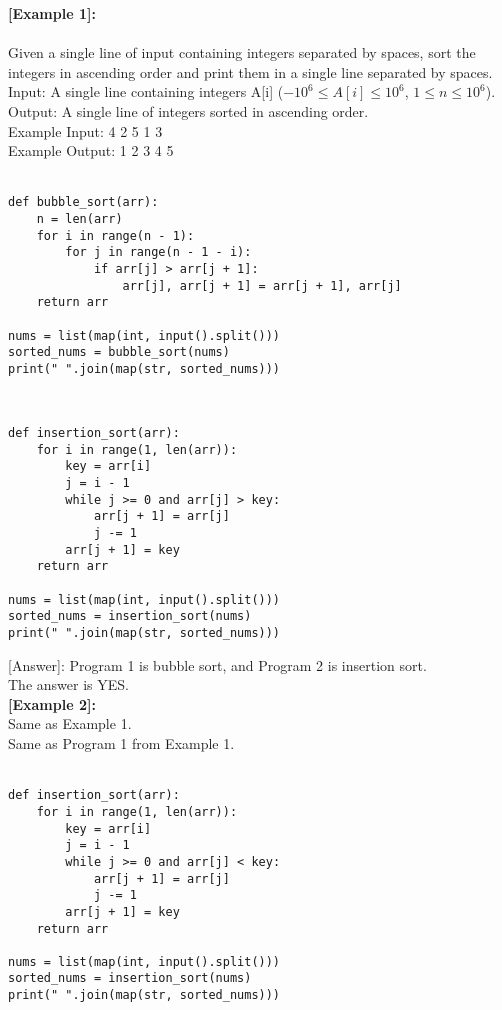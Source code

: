 \noindent\textbf{[Example 1]:}\\
\\
Given a single line of input containing integers separated by spaces, sort the integers in ascending order and print them in a single line separated by spaces.\\
Input: A single line containing integers A[i] ($-10^6 \leq A[i] \leq 10^6$, $1 \leq n \leq 10^6$).\\
Output: A single line of integers sorted in ascending order.\\
Example Input: 4 2 5 1 3\\
Example Output: 1 2 3 4 5\\

\text{[Program 1]:}\\
\begin{lstlisting}
def bubble_sort(arr):
    n = len(arr)
    for i in range(n - 1):
        for j in range(n - 1 - i):
            if arr[j] > arr[j + 1]:
                arr[j], arr[j + 1] = arr[j + 1], arr[j]
    return arr

nums = list(map(int, input().split()))
sorted_nums = bubble_sort(nums)
print(" ".join(map(str, sorted_nums)))
\end{lstlisting}

\text{[Program 2]:}\\
\begin{lstlisting}
def insertion_sort(arr):
    for i in range(1, len(arr)):
        key = arr[i]
        j = i - 1
        while j >= 0 and arr[j] > key:
            arr[j + 1] = arr[j]
            j -= 1
        arr[j + 1] = key
    return arr

nums = list(map(int, input().split()))
sorted_nums = insertion_sort(nums)
print(" ".join(map(str, sorted_nums)))
\end{lstlisting}

[Answer]: Program 1 is bubble sort, and Program 2 is insertion sort.\\
The answer is YES.\\

\noindent\textbf{[Example 2]:}\\
 Same as Example 1.\\
\text{[Program 1]:} Same as Program 1 from Example 1.\\
\text{[Program 2]:}\\
\begin{lstlisting}
def insertion_sort(arr):
    for i in range(1, len(arr)):
        key = arr[i]
        j = i - 1
        while j >= 0 and arr[j] < key:
            arr[j + 1] = arr[j]
            j -= 1
        arr[j + 1] = key
    return arr

nums = list(map(int, input().split()))
sorted_nums = insertion_sort(nums)
print(" ".join(map(str, sorted_nums)))
\end{lstlisting}

